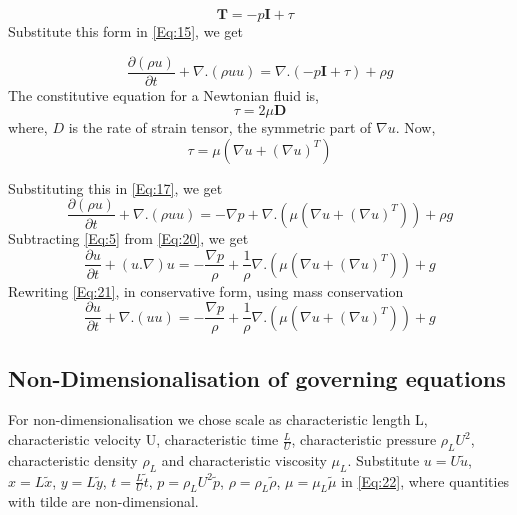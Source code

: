 \begin{equation}
 \textbf{T} = -p\textbf{I}+\textbf{$\tau$ }
\end{equation}
Substitute this form in \ref{Eq:15}, we get

\begin{equation}
 \frac{\partial (\rho u)}{\partial t} + \nabla . (\rho uu)  = \nabla .( -p\textbf{I}+\tau) + \rho g  
 \label{Eq:17}
\end{equation}
The constitutive equation for a Newtonian fluid is,
\begin{equation}
 \textbf{$\tau$} = 2\mu \textbf{D}
 \label{Eq:18}
\end{equation}
where, \textbf{$D$} is the rate of strain tensor, the symmetric part of $\nabla u$. Now,
\begin{equation}
 \text{$\tau$} = \mu (\nabla u + (\nabla u)^T)
 \label{Eq:19}
\end{equation}

Substituting this in \ref{Eq:17}, we get
\begin{equation}
 \frac{\partial (\rho u)}{\partial t} + \nabla . (\rho uu)  =  -\nabla p+ \nabla .(\mu (\nabla u + (\nabla u)^T)) + \rho g  
 \label{Eq:20}
\end{equation}
Subtracting \ref{Eq:5} from \ref{Eq:20}, we get
\begin{equation}
 \frac{\partial u}{\partial t} + (u.\nabla)u  =  -\frac{\nabla p}{\rho}+ \frac{1}{\rho}\nabla .(\mu (\nabla u + (\nabla u)^T)) +  g   
 \label{Eq:21}
\end{equation}
Rewriting \ref{Eq:21}, in conservative form, using mass conservation
\begin{equation}
 \frac{\partial u}{\partial t} + \nabla .(uu)  =  -\frac{\nabla p}{\rho}+ \frac{1}{\rho}\nabla .(\mu (\nabla u + (\nabla u)^T)) +  g  
 \label{Eq:22}
\end{equation}

\subsection{Non-Dimensionalisation of governing equations}
For non-dimensionalisation we chose scale as characteristic length  L, characteristic velocity U, characteristic time $\frac{L}{U}$, characteristic pressure $\rho_L U^2$,
characteristic density $\rho_L$ and characteristic viscosity $\mu_L$.
Substitute $u = U\tilde u $, $x = L\tilde x $, $y = L\tilde y $, $t = \frac{L}{U}\tilde t $, $p = \rho_L U^2\tilde p $, $\rho = \rho_L \tilde\rho $, $\mu = \mu_L \tilde\mu $
in \ref{Eq:22}, where quantities with tilde are non-dimensional.


